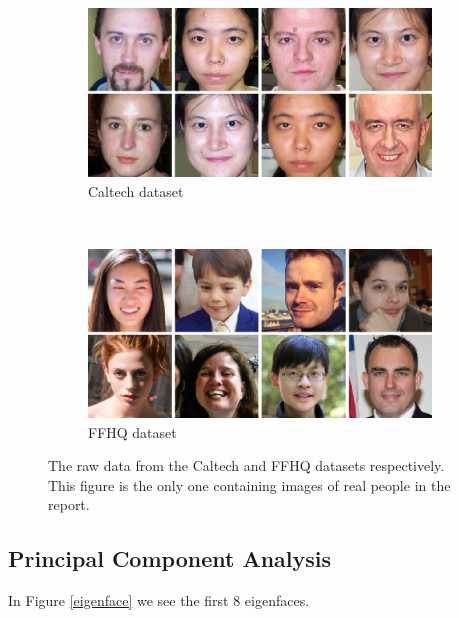 \begin{figure}[h!]
    \centering
    \begin{subfigure}[b]{0.45\textwidth}
        \includegraphics[width=\textwidth]{fig/data/caltech}
        \caption{Caltech dataset}
        \label{raw-caltech}
    \end{subfigure}
    ~
    \begin{subfigure}[b]{0.45\textwidth}
        \includegraphics[width=\textwidth]{fig/data/ffhq}
        \caption{FFHQ dataset}
        \label{raw-ffhq}
    \end{subfigure}

    \caption{The raw data from the Caltech and FFHQ datasets respectively. This figure is the only one containing images of real people in the report.}
    \label{rawdata}
\end{figure}


\subsection{Principal Component Analysis }

In Figure \ref{eigenface} we see the first 8 eigenfaces.

